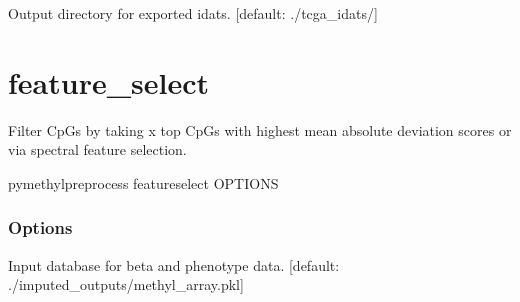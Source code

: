 \documentclass[letterpaper,10pt,english]{sphinxmanual}
\begin{document}
\begin{fulllineitems}
\label{\detokenize{index:cmdoption-pymethyl-preprocess-download-tcga-o}}
Output directory for exported idats.  {[}default: ./tcga\_idats/{]}

\end{fulllineitems}



\section{feature\_select}
\label{\detokenize{index:pymethyl-preprocess-feature-select}}
Filter CpGs by taking x top CpGs with highest mean absolute deviation scores or via spectral feature selection.

\begin{sphinxVerbatim}[commandchars=\\\{\}]
pymethyl\PYGZhy{}preprocess feature\PYGZus{}select \PYG{o}{[}OPTIONS\PYG{o}{]}
\end{sphinxVerbatim}
\subsubsection*{Options}

\begin{fulllineitems}
\label{\detokenize{index:cmdoption-pymethyl-preprocess-feature-select-i}}
Input database for beta and phenotype data.  {[}default: ./imputed\_outputs/methyl\_array.pkl{]}

\end{fulllineitems}
\end{document}
